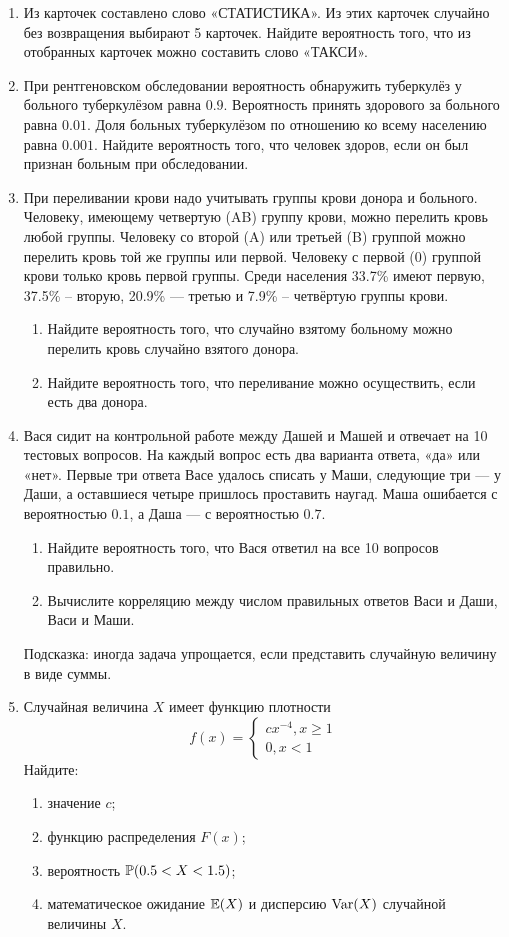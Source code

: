 \begin{enumerate}
\item Из карточек составлено слово «СТАТИСТИКА».
Из этих карточек случайно без возвращения  выбирают 5 карточек.
Найдите вероятность того, что из отобранных карточек можно составить слово «ТАКСИ».

\item При рентгеновском обследовании вероятность обнаружить туберкулёз у больного
туберкулёзом равна $0.9$. Вероятность принять здорового за больного равна $0.01$.
Доля больных туберкулёзом по отношению ко всему населению равна $0.001$.
Найдите вероятность того, что человек здоров, если он был признан больным при обследовании.

\item При переливании крови надо учитывать группы крови донора и больного.
Человеку, имеющему четвертую (AB) группу крови, можно перелить кровь любой группы.
Человеку со второй (A) или третьей (B) группой можно перелить кровь той же группы или
первой. Человеку с первой (0) группой крови только кровь первой группы.
Среди населения 33.7\% имеют первую, 37.5\% – вторую, 20.9\% — третью и 7.9\% –
четвёртую группы крови.
\begin{enumerate}
\item Найдите вероятность того, что случайно взятому больному можно перелить кровь
случайно взятого донора.
\item Найдите вероятность того, что переливание можно осуществить, если есть два донора.
\end{enumerate}

\item Вася сидит на контрольной работе между Дашей и Машей и отвечает на 10
тестовых вопросов. На каждый вопрос есть два варианта ответа, «да» или «нет».
Первые три ответа Васе удалось списать у Маши, следующие три — у Даши,
а оставшиеся четыре пришлось проставить наугад. Маша ошибается с вероятностью $0.1$,
а Даша — с вероятностью $0.7$.
\begin{enumerate}
\item Найдите вероятность того, что Вася ответил на все 10 вопросов правильно.
\item Вычислите  корреляцию между числом правильных ответов Васи и Даши, Васи и Маши.
\end{enumerate}
Подсказка: иногда задача упрощается, если представить случайную величину в виде суммы.

\item Случайная величина $X$ имеет функцию плотности
\[
f(x)=
\begin{cases}
cx^{-4}, x \geq 1 \\
0, x<1
\end{cases}
\]
Найдите:
\begin{enumerate}
\item значение $c$;
\item функцию распределения $F(x)$;
\item вероятность $\P(0.5<X<1.5)$;
\item математическое ожидание $\E(X)$ и дисперсию $\Var(X)$ случайной величины $X$.
\end{enumerate}


\end{enumerate}
